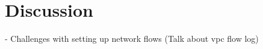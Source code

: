 
\chapter{Discussion}
\label{chap:discussion}

- Challenges with setting up network flows (Talk about vpc flow log)